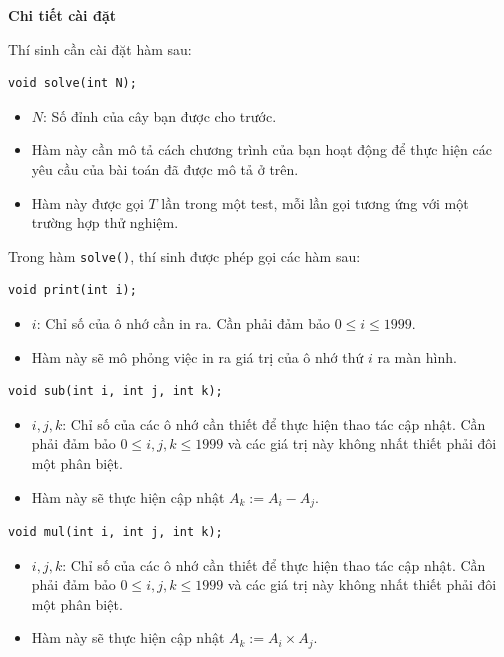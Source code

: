 \textbf{Chi tiết cài đặt}

Thí sinh cần cài đặt hàm sau:

\begin{lstlisting}
void solve(int N);
\end{lstlisting}

\begin{itemize}
   \item $N$: Số đỉnh của cây bạn được cho trước.
   \item Hàm này cần mô tả cách chương trình của bạn hoạt động để thực hiện các yêu cầu của bài toán đã được mô tả ở trên.
   \item Hàm này được gọi $T$ lần trong một test, mỗi lần gọi tương ứng với một trường hợp thử nghiệm.
\end{itemize}

Trong hàm \texttt{solve()}, thí sinh được phép gọi các hàm sau:

\begin{lstlisting}
void print(int i);
\end{lstlisting}

\begin{itemize}
   \item $i$: Chỉ số của ô nhớ cần in ra. Cần phải đảm bảo $0\le i\le 1999$.
   \item Hàm này sẽ mô phỏng việc in ra giá trị của ô nhớ thứ $i$ ra màn hình.
\end{itemize}

\begin{lstlisting}
void sub(int i, int j, int k);
\end{lstlisting}

\begin{itemize}
   \item $i,j,k$: Chỉ số của các ô nhớ cần thiết để thực hiện thao tác cập nhật. Cần phải đảm bảo $0\le i,j,k\le 1999$ và các giá trị này không nhất thiết phải đôi một phân biệt.
   \item Hàm này sẽ thực hiện cập nhật $A_k:=A_i-A_j$.
\end{itemize}

\begin{lstlisting}
void mul(int i, int j, int k);
\end{lstlisting}

\begin{itemize}
   \item $i,j,k$: Chỉ số của các ô nhớ cần thiết để thực hiện thao tác cập nhật. Cần phải đảm bảo $0\le i,j,k\le 1999$ và các giá trị này không nhất thiết phải đôi một phân biệt.
   \item Hàm này sẽ thực hiện cập nhật $A_k:=A_i\times A_j$.
\end{itemize}

